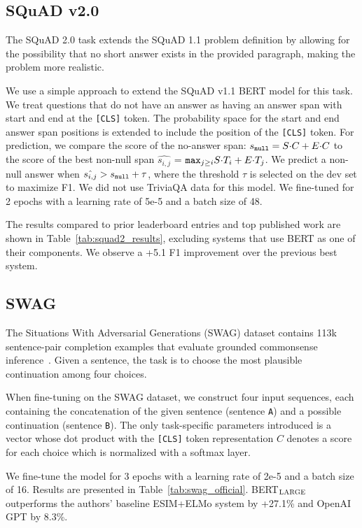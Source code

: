 \documentclass[11pt,a4paper]{article}
\newcommand\bertlarge{BERT$_{\small \textsc{LARGE}}$\xspace}
\begin{document}
\subsection{SQuAD v2.0}

The SQuAD 2.0 task extends the SQuAD 1.1 problem definition by allowing for the possibility that no short answer exists in the provided paragraph, making the problem more realistic.

We use a simple approach to extend the SQuAD v1.1 BERT model for this task. We treat questions that do not have an answer as having an answer span with start and end at the {\tt [CLS]} token. The probability space for the start and end answer span positions is extended to include the position of the {\tt [CLS]} token. For prediction, we compare the score of the no-answer span: $s_{\tt null} = S{\cdot}C + E{\cdot}C$ to the score of the best non-null span $\hat{s_{i,j}}$ =  $ {\tt max}_{j \geq i} S{\cdot}T_i + E{\cdot}T_j$. We predict a non-null answer when  $\hat{s_{i,j}} > s_{\tt null} + \tau $, where the threshold $\tau$ is selected on the dev set to maximize F1. We did not use TriviaQA data for this model. We fine-tuned for 2 epochs with a learning rate of 5e-5 and a batch size of 48.

The results compared to prior leaderboard entries and top published work \cite{unet,slqa} are shown in Table~\ref{tab:squad2_results}, excluding systems that use BERT as one of their components. We observe a +5.1 F1 improvement over the previous best system.


\subsection{SWAG}
\label{sec:swag}
The Situations With Adversarial Generations (SWAG) dataset contains 113k sentence-pair completion examples that evaluate grounded commonsense inference~\cite{zellers2018swag}. Given a sentence, the task is to choose the most plausible continuation among four choices.


When fine-tuning on the SWAG dataset, we construct four input sequences, each containing the concatenation of the given sentence (sentence {\tt A}) and a possible continuation (sentence {\tt B}). The only task-specific parameters introduced is a vector whose dot product with the {\tt [CLS]} token representation $C$ denotes a score for each choice which is normalized with a softmax layer.

We fine-tune the model for 3 epochs with a learning rate of 2e-5 and a batch size of 16. Results are presented in Table~\ref{tab:swag_official}. \bertlarge outperforms the authors' baseline ESIM+ELMo system by +27.1\% and OpenAI GPT by 8.3\%.
\end{document}
